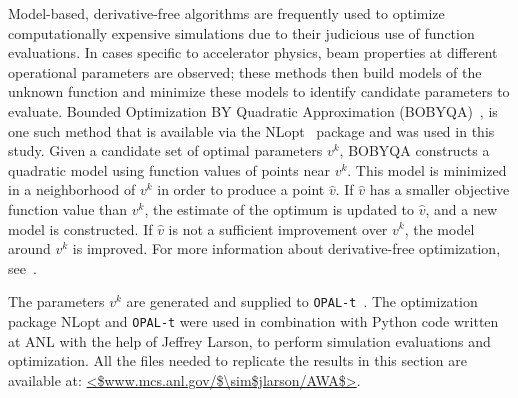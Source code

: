 Model-based, derivative-free algorithms are frequently used to optimize
computationally expensive simulations due to their judicious use of function
evaluations. In cases specific to accelerator physics, 
beam properties at different operational parameters are observed;
these methods then build models of the unknown
function and minimize these models to identify candidate parameters to 
evaluate. Bounded Optimization BY Quadratic Approximation (BOBYQA)~\cite{bobyqa},
 is one such method that is available via the
NLopt~\cite{nlopt} package and was used in this study. 
Given a candidate set of optimal parameters $v^k$, BOBYQA
constructs a quadratic model using function values of points near $v^k$. 
This model is minimized in a neighborhood of $v^k$ in order to produce a point $\hat{v}$. 
If $\hat{v}$ has a smaller objective function value than $v^k$, 
the estimate of the optimum is updated to $\hat{v}$, and a new model is constructed. 
If $\hat{v}$ is not a sufficient improvement over $v^k$, 
the model around $v^k$ is improved. For more
information about derivative-free optimization, see~\cite{Conn2009a}.

The parameters $v^k$ are generated and supplied to \verb|OPAL-t|~\cite{opal}. 
The optimization package NLopt and \verb|OPAL-t| were used
in combination with Python code written at ANL with the help 
of Jeffrey Larson, to perform simulation evaluations and optimization.
All the files needed to replicate the results in this section are available at: 
\url{<$www.mcs.anl.gov/$\sim$jlarson/AWA$>}.  


